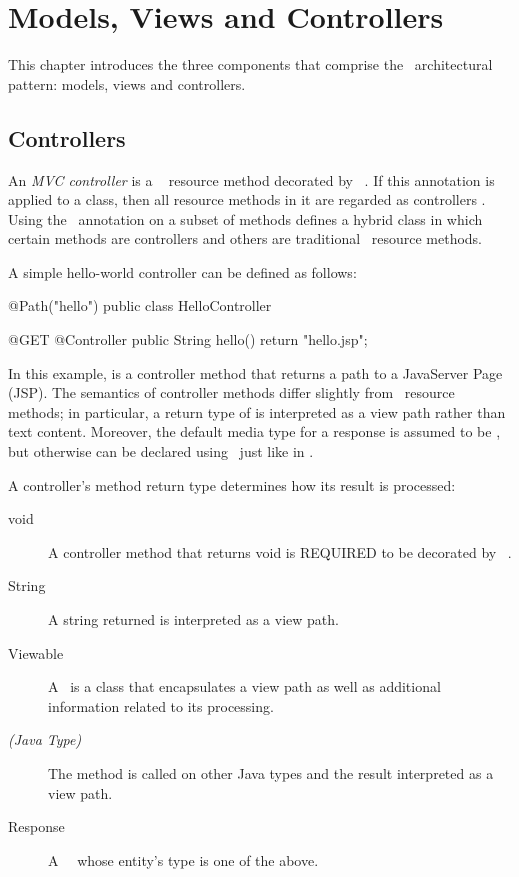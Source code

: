 \chapter{Models, Views and Controllers}
\label{mvc}

This chapter introduces the three components that comprise the \mvc\ architectural 
pattern: models, views and controllers. 

\section{Controllers}
\label{controllers}

An {\em MVC controller} is a \jaxrs\ \cite{jaxrs} resource method decorated by 
\Controller\ . 
If this annotation is applied to a class, then all resource methods in it are regarded as controllers
. 
Using the \Controller\ annotation on a subset of methods defines a hybrid class in which 
certain methods are controllers and others are traditional \jaxrs\ resource methods.

A simple hello-world controller can be defined as follows:

\begin{listing}{1}
@Path("hello")
public class HelloController {

    @GET
    @Controller
    public String hello() {
        return "hello.jsp";
    }
}
\end{listing}

In this example,  is a controller method that returns a path to a JavaServer Page (JSP).
The semantics of controller methods differ slightly from \jaxrs\ resource methods; in particular, a
return type of  is interpreted as a view path rather than text content. Moreover,
the default media type for a response is assumed to be , but otherwise can
be declared using \Produces\ just like in \jaxrs.

A controller's method return type determines how its result is processed:

\begin{description}
\item[void] A controller method that returns void is REQUIRED to be decorated by \View\
. 
\item[String] A string returned is interpreted as a view path. 
\item[Viewable] A \Viewable\ is a class that encapsulates a view path as well as
additional information related to its processing.
\item[{\em (Java Type)}] The method  is called on other Java types and the
result interpreted as a view path. 
\item[Response] A \jaxrs\ \Response\ whose entity's type is one of the above.
\end{description}

